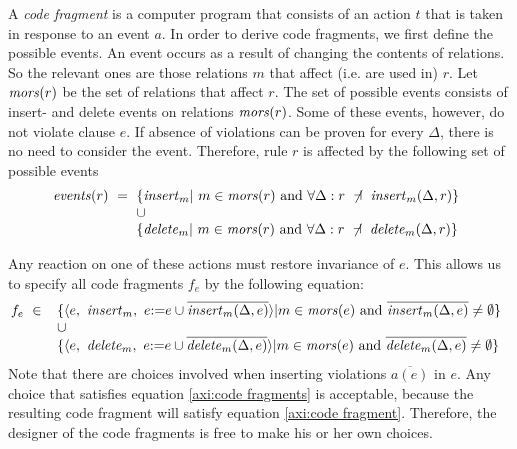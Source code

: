 \documentclass[11pt,a4paper,fleqn,oneside]{article}
\def\id#1{\text{\em #1\/}}
\def\define#1{\label{dfn:#1}{\em #1}\index{#1}}
\newcommand{\cmpl}[1]{\overline{#1}}
\newcommand{\subs}{\dashv}
\begin{document}
	A \define{code fragment} is a computer program that consists of an action $t$
	that is taken in response to an event $a$.
	In order to derive code fragments, we first define the possible events.
	An event occurs as a result of changing the contents of relations.
	So the relevant ones are those relations $m$ that affect (i.e. are used in) $r$.
	Let $\id{mors}(r)$ be the set of relations that affect $r$.
	The set of possible events consists of insert- and delete events on relations $\id{mors}(r)$.
	Some of these events, however, do not violate clause $e$.
	If absence of violations can be proven for every $\Delta$,
	there is no need to consider the event.
	Therefore, rule $r$ is affected by the following set of possible events
\[\id{events}(r)\ =\ \begin{array}[t]{@{}l}	
       \{\id{insert}_m |\ m\in\id{mors}(r)\text{ and }\forall\Delta: r\ \not\subs\ \id{insert}_m(\Delta,r)\}\\
               \cup\\
       \{\id{delete}_m |\ m\in\id{mors}(r)\text{ and }\forall\Delta: r\ \not\subs\ \id{delete}_m(\Delta,r)\}\\
\end{array}\]

	Any reaction on one of these actions must restore invariance of $e$.
	This allows us to specify all code fragments $f_e$ by the following equation:
\begin{equation}
    f_e\ \in\ \begin{array}[t]{l}
               \{\langle e,\ \id{insert}_m,\ e{\tt :=}e\cup\cmpl{\id{insert}_m(\Delta,e)}\rangle
               |m\in\id{mors}(e)\text{ and }\cmpl{\id{insert}_m(\Delta,e)}\not = \emptyset\}\\
               \cup\\
               \{\langle e,\ \id{delete}_m,\ e{\tt :=}e\cup\cmpl{\id{delete}_m(\Delta,e)}\rangle
               |m\in\id{mors}(e)\text{ and }\cmpl{\id{delete}_m(\Delta,e)}\not = \emptyset\}\\
              \end{array}
\label{axi:code fragments}
\end{equation}
	Note that there are choices involved when inserting violations $\cmpl{a(e)}$ in $e$.
	Any choice that satisfies equation \ref{axi:code fragments} is acceptable,
	because the resulting code fragment will satisfy equation \ref{axi:code fragment}.
	Therefore, the designer of the code fragments is free to make his or her own choices.
\end{document}
